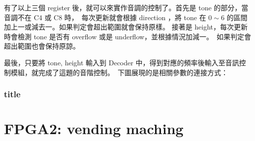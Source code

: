 \documentclass[10.5pt,compsoc,UTF8]{CjC}
\theoremstyle{mystyle}
\begin{document}
有了以上三個 register 後，就可以來實作音調的控制了。首先是 tone 的部分，當音調不在 C4 或 C8 時，\
每次更新就會根據 direction ，將 tone 在 $0 \sim 6$ 的區間加上一或減去一。如果判定會超出範圍就會保持原樣。
接著是 height，每次更新時會檢測 tone 是否有 overflow 或是 underflow，並根據情況加減一。\
如果判定會超出範圍也會保持原諒。

最後，只要將 tone, height 輸入到 Decoder 中，得到對應的頻率後輸入至音訊控制模組，就完成了這題的音階控制。\
下圖展現的是相關參數的連接方式：

\subsubsection*{title}

\section{FPGA2: vending maching}
\end{document}
